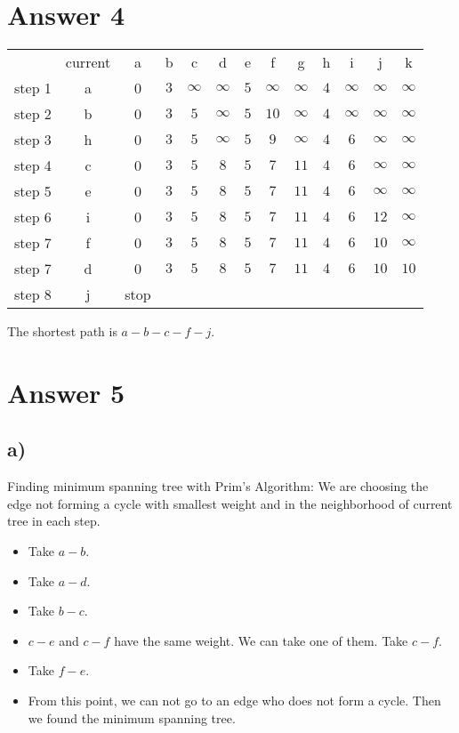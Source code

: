 \documentclass[12pt]{article}
\begin{document}
\section*{Answer 4}

\begin{center}
\begin{tabular}{ c c c c c c c c c c c c c }
 $ $ & current & a & b & c & d & e & f & g & h & i & j & k \\
 step 1 & a & 0 & $3$ & $\infty$ & $\infty$ & $5$ & $\infty$ & $\infty$ & $4$ & $\infty$ & $\infty$ & $\infty$ \\ 
 step 2 & b & 0 & $3$ & $5$ & $\infty$ & $5$ & $10$ & $\infty$ & $4$ & $\infty$ & $\infty$ & $\infty$ \\ 
 step 3 & h & 0 & $3$ & $5$ & $\infty$ & $5$ & $9$ & $\infty$ & $4$ & $6$ & $\infty$ & $\infty$ \\ 
 step 4 & c & 0 & $3$ & $5$ & $8$ & $5$ & $7$ & $11$ & $4$ & $6$ & $\infty$ & $\infty$ \\ 
 step 5 & e & 0 & $3$ & $5$ & $8$ & $5$ & $7$ & $11$ & $4$ & $6$ & $\infty$ & $\infty$ \\ 
 step 6 & i & 0 & $3$ & $5$ & $8$ & $5$ & $7$ & $11$ & $4$ & $6$ & $12$ & $\infty$ \\ 
 step 7 & f & 0 & $3$ & $5$ & $8$ & $5$ & $7$ & $11$ & $4$ & $6$ & $10$ & $\infty$ \\ 
 step 7 & d & 0 & $3$ & $5$ & $8$ & $5$ & $7$ & $11$ & $4$ & $6$ & $10$ & $10$ \\ 
 step 8 & j & stop \\ 
\end{tabular}
\end{center}
The shortest path is $a-b-c-f-j$.

\section*{Answer 5}
\subsection*{a)}
Finding minimum spanning tree with Prim's Algorithm:
We are choosing the edge not forming a cycle with smallest weight and in the neighborhood of current tree in each step.
\begin{itemize}
\item Take $a-b$.
\item Take $a-d$.
\item Take $b-c$.
\item $c-e$ and $c-f$ have the same weight. We can take one of them. Take $c-f$.
\item Take $f-e$. 
\item From this point, we can not go to an edge who does not form a cycle. Then we found the minimum spanning tree.
\end{itemize}
\end{document}

